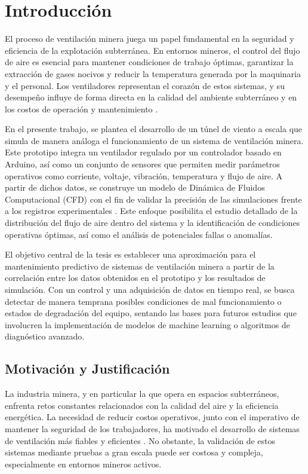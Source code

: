 \chapter{Introducción}

El proceso de ventilación minera juega un papel fundamental en la seguridad y eficiencia de la explotación subterránea. En entornos mineros, el control del flujo de aire es esencial para mantener condiciones de trabajo óptimas, garantizar la extracción de gases nocivos y reducir la temperatura generada por la maquinaria y el personal. Los ventiladores representan el corazón de estos sistemas, y su desempeño influye de forma directa en la calidad del ambiente subterráneo y en los costos de operación y mantenimiento \cite{Zhou2020, Sanchis2022}.

En el presente trabajo, se plantea el desarrollo de un túnel de viento a escala que simula de manera análoga el funcionamiento de un sistema de ventilación minera. Este prototipo integra un ventilador regulado por un controlador basado en Arduino, así como un conjunto de sensores que permiten medir parámetros operativos como corriente, voltaje, vibración, temperatura y flujo de aire. A partir de dichos datos, se construye un modelo de Dinámica de Fluidos Computacional (CFD) con el fin de validar la precisión de las simulaciones frente a los registros experimentales \cite{ANSYS2021}. Este enfoque posibilita el estudio detallado de la distribución del flujo de aire dentro del sistema y la identificación de condiciones operativas óptimas, así como el análisis de potenciales fallas o anomalías.

El objetivo central de la tesis es establecer una aproximación para el mantenimiento predictivo de sistemas de ventilación minera a partir de la correlación entre los datos obtenidos en el prototipo y los resultados de simulación. Con un control y una adquisición de datos en tiempo real, se busca detectar de manera temprana posibles condiciones de mal funcionamiento o estados de degradación del equipo, sentando las bases para futuros estudios que involucren la implementación de modelos de machine learning o algoritmos de diagnóstico avanzado.

\section{Motivación y Justificación}
La industria minera, y en particular la que opera en espacios subterráneos, enfrenta retos constantes relacionados con la calidad del aire y la eficiencia energética. La necesidad de reducir costos operativos, junto con el imperativo de mantener la seguridad de los trabajadores, ha motivado el desarrollo de sistemas de ventilación más fiables y eficientes \cite{Zhou2020}. No obstante, la validación de estos sistemas mediante pruebas a gran escala puede ser costosa y compleja, especialmente en entornos mineros activos.

